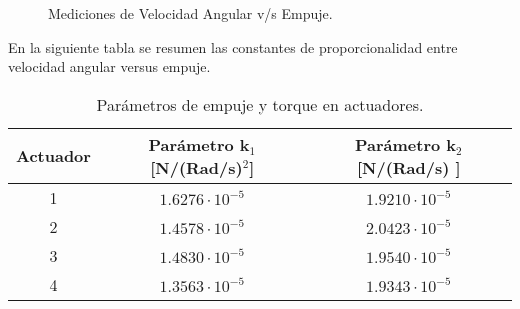 \documentclass[\main/main.tex]{subfiles}
\begin{document}
\begin{figure}[H]
\noindent \begin{centering}
\par\end{centering}
\noindent \begin{centering}
\par\end{centering}
\caption{Mediciones de Velocidad Angular v/s Empuje.}
\end{figure}

\textcompwordmark{}

En la siguiente tabla se resumen las constantes de proporcionalidad
entre velocidad angular versus empuje. 

\begin{table}[H]
\noindent \begin{centering}
\begin{tabular}{|c|c|c|}
\hline 
Actuador & Parámetro k$_1$ {[}N/(Rad/s)$^{2}${]} & Parámetro k$_2$ {[}N/(Rad/s) {]}\tabularnewline
\hline 
\hline 
1 & $1.6276\cdot10^{-5}$ & $1.9210\cdot10^{-5}$\tabularnewline
\hline 
2 & $1.4578\cdot10^{-5}$ & $2.0423\cdot10^{-5}$\tabularnewline
\hline 
3 & $1.4830\cdot10^{-5}$ & $1.9540\cdot10^{-5}$\tabularnewline
\hline 
4 & $1.3563\cdot10^{-5}$ & $1.9343\cdot10^{-5}$\tabularnewline
\hline 
\end{tabular}
\par\end{centering}
\caption{Parámetros de empuje y torque en actuadores.}
\end{table}
\end{document}
